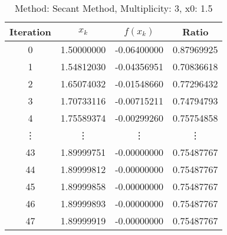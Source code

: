 \begin{table}
\centering
\caption{Method: Secant Method, Multiplicity: 3, x0: 1.5}
\label{tab:table_Secant_Method_3_1_5}
\begin{tabular}{c c c c}
\toprule
Iteration &      $x_k$ &    $f(x_k)$ &      Ratio \\
\midrule
        0 & 1.50000000 & -0.06400000 & 0.87969925 \\
        1 & 1.54812030 & -0.04356951 & 0.70836618 \\
        2 & 1.65074032 & -0.01548660 & 0.77296432 \\
        3 & 1.70733116 & -0.00715211 & 0.74794793 \\
        4 & 1.75589374 & -0.00299260 & 0.75754858 \\
   \vdots &     \vdots &      \vdots &     \vdots \\
       43 & 1.89999751 & -0.00000000 & 0.75487767 \\
       44 & 1.89999812 & -0.00000000 & 0.75487767 \\
       45 & 1.89999858 & -0.00000000 & 0.75487767 \\
       46 & 1.89999893 & -0.00000000 & 0.75487767 \\
       47 & 1.89999919 & -0.00000000 & 0.75487767 \\
\bottomrule
\end{tabular}
\end{table}
